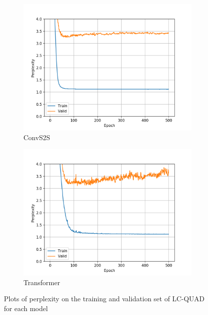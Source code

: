 \begin{figure}[H]
\begin{subfigure}{0.45\textwidth}
\includegraphics[width=\textwidth]{../results/lc-quad1/run2/fconv_wmt_en_de/ppls.png} 
\caption{ConvS2S}
\label{fig:lcquad convs2s ppl}
\end{subfigure}
\hfill
\begin{subfigure}{0.45\textwidth}
\includegraphics[width=\textwidth]{../results/lc-quad1/run1/transformer_iwslt_de_en/ppls.png}
\caption{Transformer}
\label{fig:lcquad transformer ppl}
\end{subfigure}
\hfill
\caption{Plots of perplexity on the training and validation set of LC-QUAD for each model}
\label{fig:lcquad ppls}
\end{figure}


